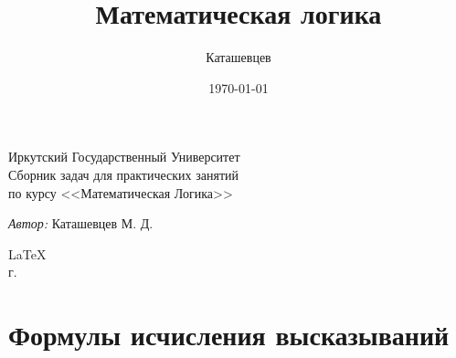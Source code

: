\documentclass[a4paper,10pt]{report}
\date{\today}
\author{Каташевцев}
\title{Математическая логика}
\begin{document}
\begin{titlepage}

\begin{center}
 \large Иркутский Государственный Университет
 \\[4.5cm]
 \huge Сборник задач для практических занятий 
 \\[0.6cm]
 \large по курсу <<Математическая Логика>>
 \\[3.6cm]
\end{center}
 

\begin{flushright}
\begin{minipage}{0.5\textwidth}
 \begin{flushright}
  \emph{Автор:} Каташевцев М. Д.\\
 \end{flushright}
 
 \end{minipage}
\end{flushright}
\begin{center}
 \vfill 
 
 {\large \LaTeX}\\[0.4cm]
 {\large \the\year г.}
 \thispagestyle{empty}
\end{center}

\end{titlepage}

\tableofcontents

\chapter{Формулы исчисления высказываний}
\end{document}
